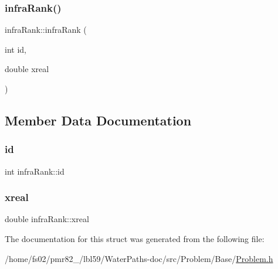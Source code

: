 \subsubsection{\texorpdfstring{infra\+Rank()}{infraRank()}}
{\footnotesize\ttfamily infra\+Rank\+::infra\+Rank (\begin{DoxyParamCaption}\item[{int}]{id,  }\item[{double}]{xreal }\end{DoxyParamCaption})\hspace{0.3cm}{\ttfamily [inline]}}



\subsection{Member Data Documentation}
\mbox{\label{structinfraRank_ace3640f7fdc691b68111cf07e0eabaae}} 
\subsubsection{\texorpdfstring{id}{id}}
{\footnotesize\ttfamily int infra\+Rank\+::id}

\mbox{\label{structinfraRank_a1bb966369809456d65bd4e2d4e19d775}} 
\subsubsection{\texorpdfstring{xreal}{xreal}}
{\footnotesize\ttfamily double infra\+Rank\+::xreal}



The documentation for this struct was generated from the following file\+:\begin{DoxyCompactItemize}
\item 
/home/fs02/pmr82\+\_/lbl59/\+Water\+Paths-\/doc/src/\+Problem/\+Base/\mbox{\hyperlink{Problem_8h}{Problem.\+h}}\end{DoxyCompactItemize}
